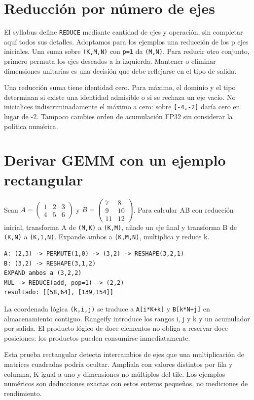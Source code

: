 \documentclass[12pt,a4paper,oneside]{report}
\begin{document}
\section{Reducción por número de ejes}
El syllabus define \texttt{REDUCE} mediante cantidad de ejes y operación, sin completar aquí todos sus detalles. Adoptamos para los ejemplos una reducción de los p ejes iniciales. Una suma sobre \texttt{(K,M,N)} con \texttt{p=1} da \texttt{(M,N)}. Para reducir otro conjunto, primero permuta los ejes deseados a la izquierda. Mantener o eliminar dimensiones unitarias es una decisión que debe reflejarse en el tipo de salida.

Una reducción suma tiene identidad cero. Para máximo, el dominio y el tipo determinan si existe una identidad admisible o si se rechaza un eje vacío. No inicialices indiscriminadamente el máximo a cero: sobre \texttt{[-4,-2]} daría cero en lugar de -2. Tampoco cambies orden de acumulación FP32 sin considerar la política numérica.

\section{Derivar GEMM con un ejemplo rectangular}
Sean $A=\left(\begin{smallmatrix}1&2&3\\4&5&6\end{smallmatrix}\right)$ y $B=\left(\begin{smallmatrix}7&8\\9&10\\11&12\end{smallmatrix}\right)$. Para calcular AB con reducción inicial, transforma A de \texttt{(M,K)} a \texttt{(K,M)}, añade un eje final y transforma B de \texttt{(K,N)} a \texttt{(K,1,N)}. Expande ambos a \texttt{(K,M,N)}, multiplica y reduce k.

\begin{lstlisting}
A: (2,3) -> PERMUTE(1,0) -> (3,2) -> RESHAPE(3,2,1)
B: (3,2) -> RESHAPE(3,1,2)
EXPAND ambos a (3,2,2)
MUL -> REDUCE(add, pop=1) -> (2,2)
resultado: [[58,64], [139,154]]
\end{lstlisting}
La coordenada lógica \texttt{(k,i,j)} se traduce a \texttt{A[i*K+k]} y \texttt{B[k*N+j]} en almacenamiento contiguo. Rangeify introduce los rangos i, j y k y un acumulador por salida. El producto lógico de doce elementos no obliga a reservar doce posiciones: los productos pueden consumirse inmediatamente.

Esta prueba rectangular detecta intercambios de ejes que una multiplicación de matrices cuadradas podría ocultar. Amplíala con valores distintos por fila y columna, K igual a uno y dimensiones no múltiplos del tile. Los ejemplos numéricos son deducciones exactas con estos enteros pequeños, no mediciones de rendimiento.
\end{document}
